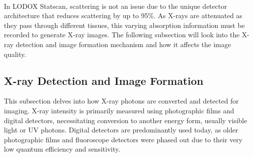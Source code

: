  In  LODOX\textsuperscript{\textregistered} Statscan\textsuperscript{\textregistered}, scattering is not an issue due to the unique detector architecture that reduces scattering by up to 95\%\cite{amirlak_novel_2009}. As X-rays are attenuated as they pass through different tissues, this varying absorption information must be recorded to generate X-ray images. The following subsection will look into the X-ray detection and image formation mechanism and how it affects the image quality.

\subsection{X-ray Detection and Image Formation}
\label{ch:LitReview:X-ray Detection and Image Formation}
This subsection delves into how X-ray photons are converted and detected for imaging. X-ray intensity is primarily measured using photographic films and digital detectors, necessitating conversion to another energy form, usually visible light or \gls{UV}  photons. Digital detectors are predominantly used today, as older photographic films and fluoroscope detectors were phased out due to their very low quantum efficiency and sensitivity. 

